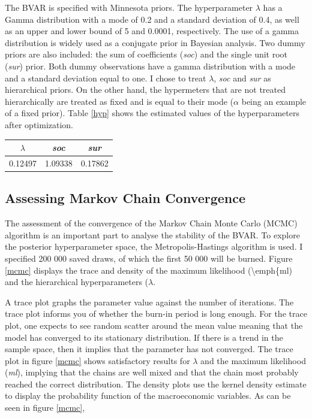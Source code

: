 \documentclass[11pt,preprint, authoryear]{elsarticle}
\let\origtable\table
\let\endorigtable\endtable
\renewenvironment{table}[1][2] {
    \expandafter\origtable\expandafter[H]
} {
    \endorigtable
}
\numberwithin{equation}{section}
\numberwithin{figure}{section}
\numberwithin{table}{section}
\begin{document}
The BVAR is specified with Minnesota priors. The hyperparameter
\(\lambda\) has a Gamma distribution with a mode of 0.2 and a standard
deviation of 0.4, as well as an upper and lower bound of 5 and 0.0001,
respectively. The use of a gamma distribution is widely used as a
conjugate prior in Bayesian analysis. Two dummy priors are also
included: the sum of coefficients (\emph{soc}) and the single unit root
(\emph{sur}) prior. Both dummy observations have a gamma distribution
with a mode and a standard deviation equal to one. I chose to treat
\(\lambda\), \emph{soc} and \emph{sur} as hierarchical priors. On the
other hand, the hypermeters that are not treated hierarchically are
treated as fixed and is equal to their mode (\(\alpha\) being an example
of a fixed prior). Table \ref{hyp} shows the estimated values of the
hyperparameters after optimization.

\begin{table}
\begin{center}
\begin{tabular}{ |c|c|c| } 
 \hline
 \(\lambda\) & \emph{soc} & \emph{sur}\\ 
 \hline
 0.12497 & 1.09338 & 0.17862 \\
 \hline
\end{tabular}
\caption{Hyperparamter Value after Estimation}
 \label{hyp}
\end{center}
\end{table}

\hypertarget{assessing-markov-chain-convergence}{%
\subsection{Assessing Markov Chain
Convergence}\label{assessing-markov-chain-convergence}}

The assessment of the convergence of the Markov Chain Monte Carlo (MCMC)
algorithm is an important part to analyse the stability of the BVAR. To
explore the posterior hyperparameter space, the Metropolis-Hastings
algorithm is used. I specified 200 000 saved draws, of which the first
50 000 will be burned. Figure \ref{mcmc} displays the trace and density
of the maximum likelihood (\textbackslash emph\{ml) and the hierarchical
hyperparameters (\(\lambda\).

A trace plot graphs the parameter value against the number of
iterations. The trace plot informs you of whether the burn-in period is
long enough. For the trace plot, one expects to see random scatter
around the mean value meaning that the model has converged to its
stationary distribution. If there is a trend in the sample space, then
it implies that the parameter has not converged. The trace plot in
figure \ref{mcmc} shows satisfactory results for \(\lambda\) and the
maximum likelihood (\emph{ml}), implying that the chains are well mixed
and that the chain most probably reached the correct distribution. The
density plots use the kernel density estimate to display the probability
function of the macroeconomic variables. As can be seen in figure
\ref{mcmc},
\end{document}
